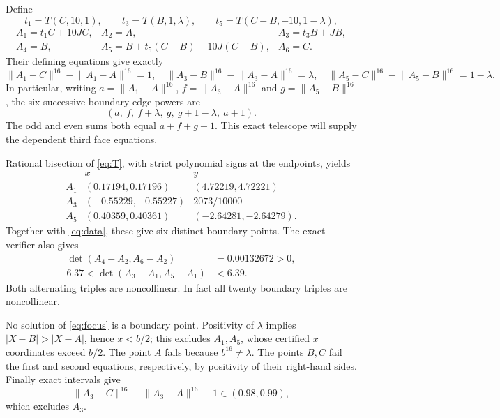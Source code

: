 \documentclass[11pt]{article}
\newcommand{\N}[2]{\lVert #1-#2\rVert^{16}}
\newcommand{\detv}[2]{\det(#1,#2)}
\begin{document}
Define
\[
 t_1=T(C,10,1),\qquad t_3=T(B,1,\lambda),\qquad
 t_5=T(C-B,-10,1-\lambda),
\]
\begin{equation}\label{eq:boundary}
\begin{array}{lll}
 A_1=t_1C+10JC,&A_2=A,&A_3=t_3B+JB,\\
 A_4=B,&A_5=B+t_5(C-B)-10J(C-B),&A_6=C.
\end{array}
\end{equation}
Their defining equations give exactly
\begin{equation}\label{eq:boundaryidentities}
 \N{A_1}{C}-\N{A_1}{A}=1,\quad
 \N{A_3}{B}-\N{A_3}{A}=\lambda,\quad
 \N{A_5}{C}-\N{A_5}{B}=1-\lambda.
\end{equation}
In particular, writing $a=\N{A_1}{A}$, $f=\N{A_3}{A}$ and $g=\N{A_5}{B}$, the six successive boundary edge powers are
\begin{equation}\label{eq:edges}
 (a,\ f,\ f+\lambda,\ g,\ g+1-\lambda,\ a+1).
\end{equation}
The odd and even sums both equal $a+f+g+1$. This exact telescope will supply the dependent third face equations.

Rational bisection of \eqref{eq:T}, with strict polynomial signs at the endpoints, yields
\[
\begin{array}{c|cc}
 &x&y\\\hline
 A_1&(0.17194,0.17196)&(4.72219,4.72221)\\
 A_3&(-0.55229,-0.55227)&2073/10000\\
 A_5&(0.40359,0.40361)&(-2.64281,-2.64279).
\end{array}
\]
Together with \eqref{eq:data}, these give six distinct boundary points. The exact verifier also gives
\begin{align*}
 \detv{A_4-A_2}{A_6-A_2}&=0.00132672>0,\\
 6.37<\detv{A_3-A_1}{A_5-A_1}&<6.39.
\end{align*}
Both alternating triples are noncollinear. In fact all twenty boundary triples are noncollinear.

No solution of \eqref{eq:focus} is a boundary point. Positivity of $\lambda$ implies $|X-B|>|X-A|$, hence $x<b/2$; this excludes $A_1,A_5$, whose certified $x$ coordinates exceed $b/2$. The point $A$ fails because $b^{16}\ne\lambda$. The points $B,C$ fail the first and second equations, respectively, by positivity of their right-hand sides. Finally exact intervals give
\[
 \N{A_3}{C}-\N{A_3}{A}-1\in(0.98,0.99),
\]
which excludes $A_3$.
\end{document}
